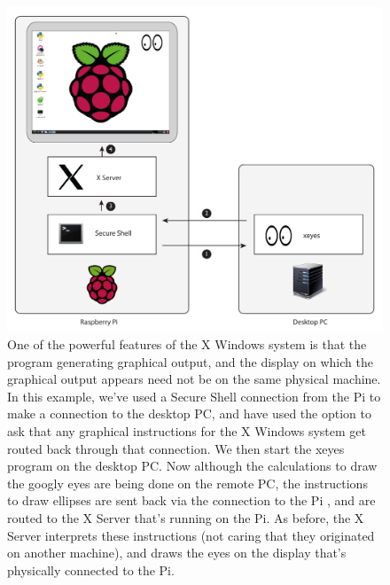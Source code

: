 \begin{figure}
\centerline{\includegraphics[width=17cm]{images/x-via-ssh}}
\caption{One of the powerful features of the X Windows system is that the program generating graphical output, and the display on which the graphical output appears need not be on the same physical machine. In this example, we've used a Secure Shell connection from the Pi \protect{} to make a connection to the desktop PC, and have used the  option to ask that any graphical instructions for the X Windows system get routed back through that connection. We then start the xeyes program on the desktop PC. Now although the calculations to draw the googly eyes are being done on the remote PC, the instructions to draw ellipses are sent back via the  connection to the Pi  \protect{}, and are \protect{} routed to the X Server that's running on the Pi. As before, the X Server \protect{} interprets these instructions (not caring that they originated on another machine), and draws the eyes on the display that's physically connected to the Pi.}\label{figure:x-via-ssh}
\end{figure}





